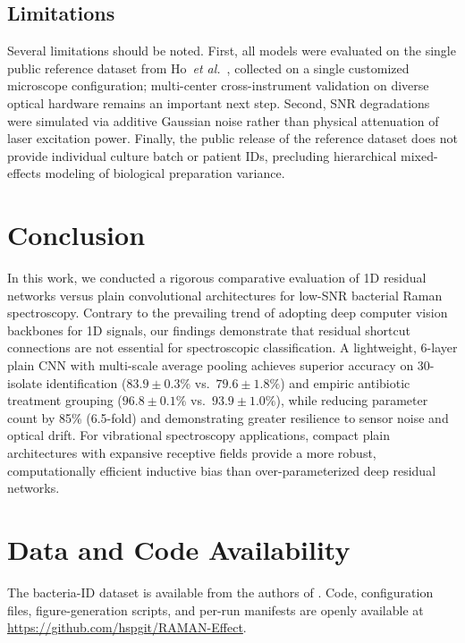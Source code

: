 \documentclass[journal,onecolumn]{IEEEtran}
\begin{document}
\subsection{Limitations}
\label{sec:disc-limitations}
Several limitations should be noted. First, all models were evaluated on the
single public reference dataset from Ho~\textit{et al.}~\cite{ho2019rapid},
collected on a single customized microscope configuration; multi-center cross-instrument
validation on diverse optical hardware remains an important next step. Second, SNR
degradations were simulated via additive Gaussian noise rather than physical
attenuation of laser excitation power. Finally, the public release of the reference
dataset does not provide individual culture batch or patient IDs, precluding
hierarchical mixed-effects modeling of biological preparation variance.

\section{Conclusion}
\label{sec:conclusion}
In this work, we conducted a rigorous comparative evaluation of 1D residual networks
versus plain convolutional architectures for low-SNR bacterial Raman spectroscopy.
Contrary to the prevailing trend of adopting deep computer vision backbones for 1D
signals, our findings demonstrate that residual shortcut connections are not
essential for spectroscopic classification. A lightweight, 6-layer plain CNN with
multi-scale average pooling achieves superior accuracy on 30-isolate
identification ($83.9 \pm 0.3\%$ vs.\ $79.6 \pm 1.8\%$) and empiric antibiotic treatment grouping
($96.8 \pm 0.1\%$ vs.\ $93.9 \pm 1.0\%$), while reducing parameter count by 85\% (6.5-fold) and demonstrating
greater resilience to sensor noise and optical drift. For vibrational spectroscopy
applications, compact plain architectures with expansive receptive fields provide
a more robust, computationally efficient inductive bias than over-parameterized
deep residual networks.

\section*{Data and Code Availability}
The bacteria-ID dataset is available from the authors of
\cite{ho2019rapid}. Code, configuration files, figure-generation scripts,
and per-run manifests are openly available at
\url{https://github.com/hspgit/RAMAN-Effect}.
\end{document}
